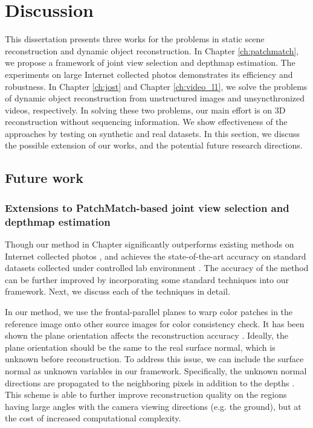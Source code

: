 \chapter{Discussion}
\label{ch:discussion}
This dissertation presents three works for the problems in static scene reconstruction and dynamic object reconstruction. In Chapter \ref{ch:patchmatch}, we propose a framework of joint view selection and depthmap estimation. The experiments on large Internet collected photos demonstrates its efficiency and robustness. In Chapter \ref{ch:jost} and Chapter \ref{ch:video_l1}, we solve the problems of dynamic object reconstruction from unstructured images and unsyncthronized videos, respectively. In solving these two problems, our main effort is on 3D reconstruction without sequencing information. We show effectiveness of the approaches by testing on synthetic and real datasets. In this section, we discuss the possible extension of our works, and the potential future research directions.

\section{Future work}

\subsection{Extensions to PatchMatch-based joint view selection and depthmap estimation}
\label{sec:patchmatch_extensions}

Though our method in Chapter \cite{ch:patchmatch} significantly outperforms existing methods on Internet collected photos \cite{Goesele07}, and achieves the state-of-the-art accuracy on standard datasets collected under controlled lab environment \cite{Strecha08}. The accuracy of the method can be further improved by incorporating some standard techniques into our framework. Next, we discuss each of the techniques in detail.

In our method, we use the frontal-parallel planes to warp color patches in the reference image onto other source images for color consistency check. It has been shown the plane orientation affects the reconstruction accuracy \cite{Gallup07,FURUKAWA_PAMI2010}. Ideally, the plane orientation should be the same to the real surface normal, which is unknown before reconstruction. To address this issue, we can include the surface normal as unknown variables in our framework. Specifically, the unknown normal directions are propagated to the neighboring pixels in addition to the depths \cite{patchMatchStereo1}. This scheme is able to further improve reconstruction quality on the regions having large angles with the camera viewing directions (e.g. the ground), but at the cost of increased computational complexity.

